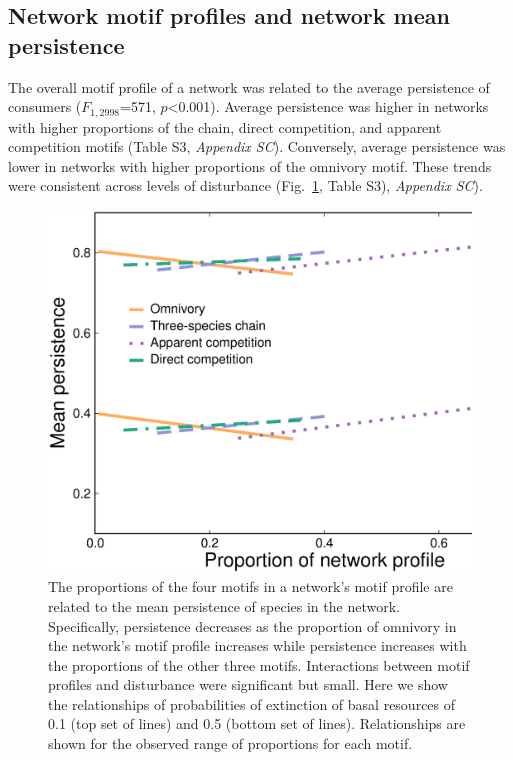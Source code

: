 \documentclass[12pt]{article}
\begin{document}
\begin{spacing}{2.0}
    \subsection*{Network motif profiles and network mean persistence}
    
        The overall motif profile of a network was related to the average persistence of consumers ($F_{1,2998}$=571, $p$\textless0.001). 
        Average persistence was higher in networks with higher proportions of the chain, direct competition, and apparent competition motifs (Table S3, \emph{Appendix SC}). 
        Conversely, average persistence was lower in networks with higher proportions of the omnivory motif. 
        These trends were consistent across levels of disturbance (Fig.~\ref{fig:motif_profile_persistence}, Table S3), \emph{Appendix SC}).%

        \begin{figure}
            \centering
            \includegraphics[width=.5\textwidth]{figures/persistence_motif_profiles.eps}
            \caption{The proportions of the four motifs in a network's motif profile are related to the mean persistence of species in the network. Specifically, persistence decreases as the proportion of omnivory in the network's motif profile increases while persistence increases with the proportions of the other three motifs. Interactions between motif profiles and disturbance were significant but small. Here we show the relationships of probabilities of extinction of basal resources of 0.1 (top set of lines) and 0.5 (bottom set of lines). Relationships are shown for the observed range of proportions for each motif.}      
            \label{fig:motif_profile_persistence}
        \end{figure}    



\end{spacing}
\end{document}
